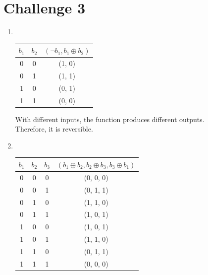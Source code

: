 \documentclass{article}
\begin{document}
\section*{Challenge 3}
 \begin{enumerate}
 \setlength{\itemsep}{1ex}
     \item
      \hspace{1pt}\\
         \begin{tabular}{|c|c|c|}
             \hline
             $b_1$ & $b_2$ & $(\neg b_1, b_1 \oplus b_2)$ \\
             \hline
             0 & 0 & (1, 0) \\
             \hline
             0 & 1 & (1, 1) \\
             \hline
             1 & 0 & (0, 1) \\
             \hline
             1 & 1 & (0, 0) \\
             \hline 
         \end{tabular}
         
        With different inputs, the function produces different outputs.\\Therefore, it is reversible.
     \item
     \hspace{1pt}\\
         \begin{tabular}{|c|c|c|c|}
              \hline
              $b_1$ & $b_2$ & $b_3$ & $(b_1 \oplus b_2, b_2 \oplus b_3, b_3 \oplus b_1)$ \\
              \hline
              0 & 0 & 0 & (0, 0, 0) \\
              \hline
              0 & 0 & 1 & (0, 1, 1) \\
              \hline
              0 & 1 & 0 & (1, 1, 0) \\
              \hline
              0 & 1 & 1 & (1, 0, 1) \\
              \hline
              1 & 0 & 0 & (1, 0, 1) \\
              \hline
              1 & 0 & 1 & (1, 1, 0) \\
              \hline
              1 & 1 & 0 & (0, 1, 1) \\
              \hline
              1 & 1 & 1 & (0, 0, 0) \\
              \hline
         \end{tabular}
         

\end{enumerate}
\end{document}
